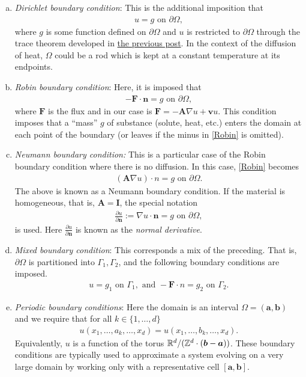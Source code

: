 \documentclass[
	a4paper,
	DIV=14,
	abstract=true,
	numbers=noenddot
]
{scrartcl}
\theoremstyle{definition}
\begin{document}
\begin{enumerate}[a)]
	\item \emph{Dirichlet boundary condition}: This is the additional imposition that
	      \begin{align*}
		      u=g \text{ on } \partial\Omega,
	      \end{align*}
	      where $g$ is some function defined on  $\partial \Omega$ and $u$ is restricted to $\partial\Omega$ through the trace theorem developed in \href{https://nowheredifferentiable.com/2023-07-12-PDEs-3-Sobolev_spaces/}{the previous post}. In the context of the diffusion of heat, $\Omega$ could be a rod which is kept at a constant temperature at its endpoints.
	\item \emph{Robin boundary condition}: Here, it is imposed that
	      \begin{align}\label{Robin}
		      -\bm{F}\cdot  \bm{n} =g \text{  on } \partial \Omega,
	      \end{align}
	      where $\bm{F}$ is the flux and in our case is $\bm{F}=-\bm{A} \nabla u+ \bm{v}u$. This condition imposes that a ``mass'' $g$ of substance (solute, heat, etc.) enters the domain at each point of the boundary (or leaves if the minus in \eqref{Robin} is omitted).
	\item \emph{Neumann boundary condition:}	This is a particular case of the Robin boundary condition where there is no diffusion. In this case, \eqref{Robin}  becomes
	      \begin{align*}
		      (\bm{A} \nabla u) \cdot n=g \text{  on } \partial \Omega.
	      \end{align*}
	      The above is known as a Neumann boundary condition. If the material is homogeneous, that is, $\bm{A}=\bm{I}$, the special notation
	      \begin{align*}
		      \frac{\partial u}{\partial \bm{n}}:= \nabla u \cdot  \bm{n} =g \text{  on } \partial \Omega,
	      \end{align*}
	      is used. Here $\frac{\partial u}{\partial \bm{n}}$ is known as the \emph{normal derivative}.
	\item \emph{Mixed boundary condition}: This corresponds a mix of the preceding. That is, $\partial \Omega$ is partitioned into $\Gamma _1, \Gamma _2$, and the following boundary conditions are imposed.
	      \begin{align*}
		      u=g_1 \text{  on }  \Gamma _1,  \text{ and }  -\bm{F} \cdot n=g_2 \text{  on }  \Gamma _2.
	      \end{align*}
	\item \emph{Periodic boundary conditions}: Here the domain is an interval  $\Omega=(\bm{a}, \bm{b})$ and we require that for all $k \in \{1,\ldots,d\} $
	      \begin{align*}
		      u(x_1,\ldots,a_k,\ldots, x_d)=u({x}_1,\ldots,{b}_k,\ldots, {x}_d).
	      \end{align*}
	      Equivalently, $u$ is a function of the torus  $\mathbb{R}^d/ (\mathbb{Z}^d \cdot (\bm{b}-\bm{a}))$. These boundary conditions are typically used to approximate a system evolving on a very large domain by working only with a representative cell $[\bm{a},\bm{b}]$.
\end{enumerate}
\end{document}

